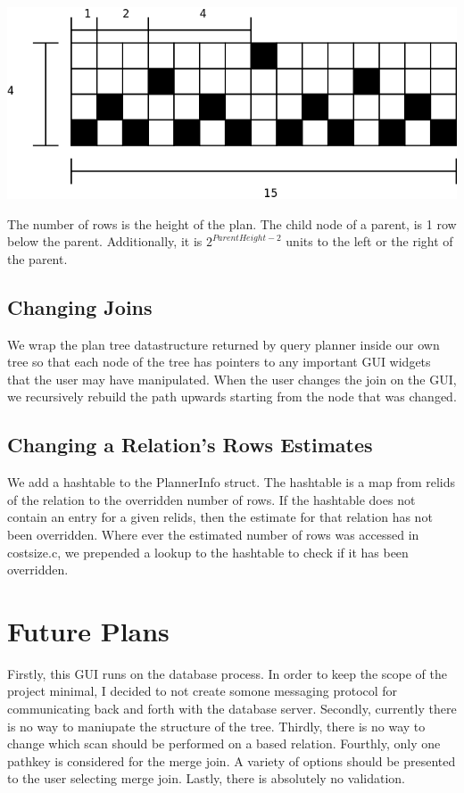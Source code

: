 \documentclass[letterpaper,10pt]{article}
\begin{document}
\includegraphics[scale=0.5]{table-derivation.png}

The number of rows is the height of the plan. The child node of a parent, is 1
row below the parent. Additionally, it is $2^{ParentHeight-2}$ units to the left
or the right of the parent.

\subsection{Changing Joins}
We wrap the plan tree datastructure returned by query planner inside our own
tree so that each node of the tree has pointers to any important GUI widgets
that the user may have manipulated. When the user changes the join on the GUI,
we recursively rebuild the path upwards starting from the node that was changed.

\subsection{Changing a Relation's Rows Estimates}
We add a hashtable to the PlannerInfo struct. The hashtable is a map from relids
of the relation to the overridden number of rows. If the hashtable does not
contain an entry for a given relids, then the estimate for that relation has not
been overridden. Where ever the estimated number of rows was accessed in costsize.c, we
prepended a lookup to the hashtable to check if it has been overridden.

\section{Future Plans}
Firstly, this GUI runs on the database process. In order to keep the scope of
the project minimal, I decided to not create somone messaging protocol for
communicating back and forth with the database server. Secondly, currently there
is no way to maniupate the structure of the tree. Thirdly, there is no way to
change which scan should be performed on a based relation. Fourthly, only one
pathkey is considered for the merge join. A variety of options should be
presented to the user selecting merge join. Lastly, there is absolutely no
validation.

\nocite{*}               

     
\end{document}
